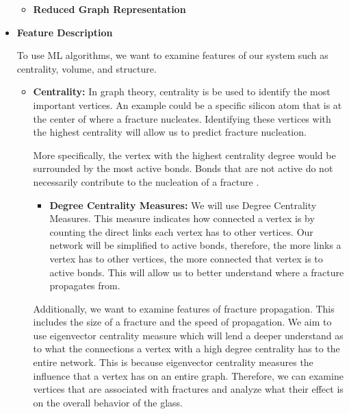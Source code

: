 \begin{itemize}
\begin{itemize}
    
\item \textbf{Reduced Graph Representation}

    
\end{itemize}


\item \textbf{Feature Description}
\bigskip

To use ML algorithms, we want to examine features of our system such as centrality, volume, and structure.

\begin{itemize}
    \item \textbf{Centrality:} In graph theory, centrality is be used to identify the most important vertices. An example could be a specific silicon atom that is at the center of where a fracture nucleates. Identifying these vertices with the highest centrality will allow us to predict fracture nucleation.
    
    \bigskip
    
    More specifically, the vertex with the highest centrality degree would be surrounded by the most active bonds. Bonds that are not active do not necessarily contribute to the nucleation of a fracture \cite{valera2018machine}.
    
    \begin{itemize}
        \item \textbf{Degree Centrality Measures:} We will use Degree Centrality Measures. This measure indicates how connected a vertex is by counting the direct links each vertex has to other vertices. Our network will be simplified to active bonds, therefore, the more links a vertex has to other vertices, the more connected that vertex is to active bonds. This will allow us to better understand where a fracture propagates from. 
    \end{itemize}
    
    \bigskip
    
    Additionally, we want to examine features of fracture propagation. This includes the size of a fracture and the speed of propagation. We aim to use eigenvector centrality measure which will lend a deeper understand as to what the connections a vertex with a high degree centrality has to the entire network. This is because eigenvector centrality measures the influence that a vertex has on an entire graph. Therefore, we can examine vertices that are associated with fractures and analyze what their effect is on the overall behavior of the glass.
    

\end{itemize}
\end{itemize}
